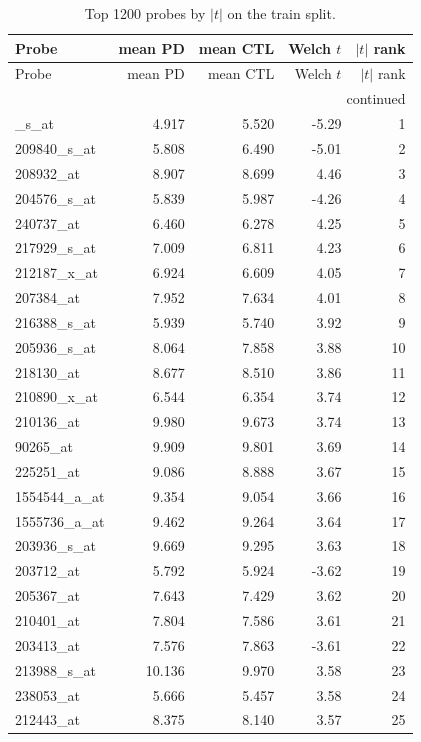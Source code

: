 \begin{footnotesize}\begin{longtable}{lrrrr}
\caption{Top 1200 probes by $|t|$ on the train split.}\\ \toprule
Probe & mean PD & mean CTL & Welch $t$ & $|t|$ rank \\ \midrule \endfirsthead
\toprule Probe & mean PD & mean CTL & Welch $t$ & $|t|$ rank \\ \midrule \endhead
\midrule \multicolumn{5}{r}{continued}\\ \endfoot \bottomrule \endlastfoot
209841\_s\_at & 4.917 & 5.520 & -5.29 & 1 \\
209840\_s\_at & 5.808 & 6.490 & -5.01 & 2 \\
208932\_at & 8.907 & 8.699 & 4.46 & 3 \\
204576\_s\_at & 5.839 & 5.987 & -4.26 & 4 \\
240737\_at & 6.460 & 6.278 & 4.25 & 5 \\
217929\_s\_at & 7.009 & 6.811 & 4.23 & 6 \\
212187\_x\_at & 6.924 & 6.609 & 4.05 & 7 \\
207384\_at & 7.952 & 7.634 & 4.01 & 8 \\
216388\_s\_at & 5.939 & 5.740 & 3.92 & 9 \\
205936\_s\_at & 8.064 & 7.858 & 3.88 & 10 \\
218130\_at & 8.677 & 8.510 & 3.86 & 11 \\
210890\_x\_at & 6.544 & 6.354 & 3.74 & 12 \\
210136\_at & 9.980 & 9.673 & 3.74 & 13 \\
90265\_at & 9.909 & 9.801 & 3.69 & 14 \\
225251\_at & 9.086 & 8.888 & 3.67 & 15 \\
1554544\_a\_at & 9.354 & 9.054 & 3.66 & 16 \\
1555736\_a\_at & 9.462 & 9.264 & 3.64 & 17 \\
203936\_s\_at & 9.669 & 9.295 & 3.63 & 18 \\
203712\_at & 5.792 & 5.924 & -3.62 & 19 \\
205367\_at & 7.643 & 7.429 & 3.62 & 20 \\
210401\_at & 7.804 & 7.586 & 3.61 & 21 \\
203413\_at & 7.576 & 7.863 & -3.61 & 22 \\
213988\_s\_at & 10.136 & 9.970 & 3.58 & 23 \\
238053\_at & 5.666 & 5.457 & 3.58 & 24 \\
212443\_at & 8.375 & 8.140 & 3.57 & 25 \\

\end{longtable}
\end{footnotesize}
